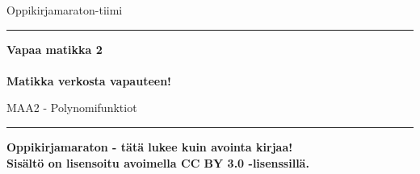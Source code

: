 
\begin{center}
    \begin{doublespace}
        \begin{LARGE}
            \textrm{Oppikirjamaraton-tiimi} \\
        \end{LARGE}
      
        \vspace{0.5cm}
        \hrule height 2pt
        \vspace{1cm}
        \begin{Huge}
            \textbf{\textrm{Vapaa matikka 2}\\\ \\Matikka verkosta vapauteen!}
        \end{Huge}
      
      
        \vfill
      
        \begin{huge}
            \textrm{MAA2 - Polynomifunktiot}
        \end{huge}
        \vspace{1cm}
        \hrule height 2pt
    \end{doublespace}
\end{center}

\vfill

\begin{flushright}
    \textbf{
        Oppikirjamaraton - tätä lukee kuin avointa kirjaa! \\
        Sisältö on lisensoitu avoimella CC BY 3.0 -lisenssillä. \\
    }
\end{flushright}